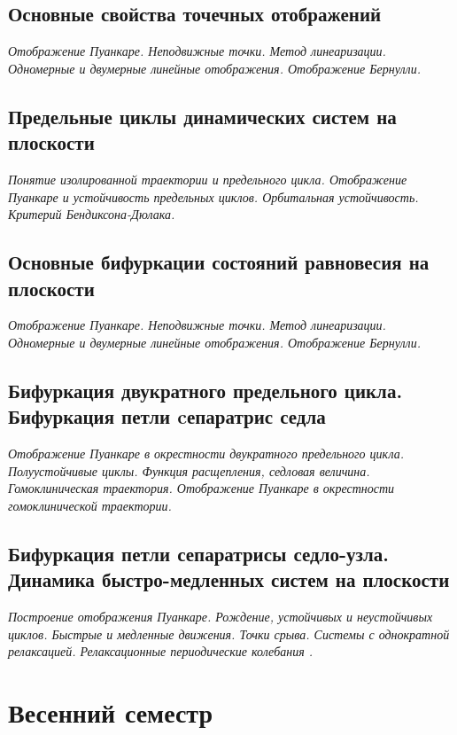 \documentclass[14pt,a4paper]{extreport}
\theoremstyle{definition}
\begin{document}
\newpage
\chapter{Основные свойства точечных отображений}
\epigraph{\textit{Отображение Пуанкаре. Неподвижные точки. Метод
линеаризации. Одномерные и двумерные линейные отображения.
Отображение Бернулли.}}{}
\label{lect6}
    

\newpage
\chapter{Предельные циклы динамических систем на плоскости}
\epigraph{\textit{Понятие изолированной траектории и предельного цикла.
Отображение Пуанкаре и устойчивость предельных циклов.
Орбитальная устойчивость. Критерий Бендиксона-Дюлака.}}
{}
\label{lect7}
    

\newpage
\chapter{Основные бифуркации состояний равновесия на плоскости}
\epigraph{\textit{Отображение Пуанкаре. Неподвижные точки. Метод
линеаризации. Одномерные и двумерные линейные отображения.
Отображение Бернулли.}}{}
\label{lect8}
    


\newpage
\chapter{Бифуркация двукратного предельного цикла. Бифуркация
петли cепаратрис седла }
\epigraph{\textit{Отображение Пуанкаре в окрестности двукратного предельного
цикла. Полуустойчивые циклы. Функция расщепления, седловая
величина. Гомоклиническая траектория. Отображение Пуанкаре в
окрестности гомоклинической траектории.}}{}
\label{lect9}
        

\newpage
\chapter{Бифуркация петли сепаратрисы седло-узла. Динамика
быстро-медленных систем на плоскости}
\epigraph{\textit{Построение отображения Пуанкаре. Рождение, устойчивых и
неустойчивых циклов. Быстрые и медленные движения. Точки
срыва. Системы с однократной релаксацией. Релаксационные
периодические колебания .}}{}
\label{lect10}
    



\part{Весенний семестр}
\newpage
\end{document}
